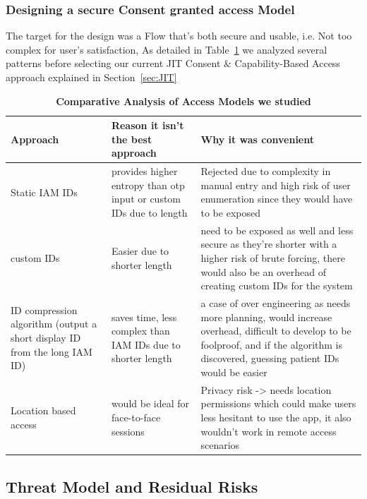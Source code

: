\subsubsection{Designing a secure Consent granted access Model}

The target for the design was a Flow that's both secure and usable, i.e. Not too complex for user's satisfaction, 
As detailed in Table~\ref{tab:access-models-analysis} we analyzed several patterns before selecting our current JIT Consent \& Capability-Based Access approach explained in Section~\ref{sec:JIT}



\begin{table}[H] 
\caption{\textbf{Comparative Analysis of Access Models we studied}}
\label{tab:access-models-analysis}
\begin{tabular}{|m{3.8cm}|m{4.7cm}|m{5.7cm}|}
\hline 
Approach&Reason it isn't the best approach&Why it was convenient \\ [0.5ex] 
\hline \hline
Static IAM IDs & provides higher entropy than otp input or custom IDs due to length & Rejected due to complexity in manual entry and high risk of user enumeration since they would have to be exposed \\
\hline
custom IDs & Easier due to shorter length & need to be exposed as well and less secure as they're shorter with a higher risk of brute forcing, there would also be an overhead of creating custom IDs for the system \\
\hline
ID compression algorithm (output a short display ID from the long IAM ID) & saves time, less complex than IAM IDs due to shorter length & a case of over engineering as needs more planning, would increase overhead, difficult to develop to be foolproof, and if the algorithm is discovered, guessing patient IDs would be easier \\
\hline
Location based access & would be ideal for face-to-face sessions & Privacy risk -> needs location permissions which could make users less hesitant to use the app, it also wouldn't work in remote access scenarios \\ [1ex] 
\hline
\end{tabular}

\end{table}

\subsection{Threat Model and Residual Risks}

